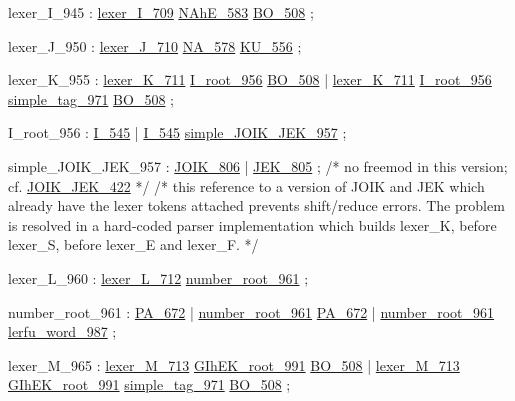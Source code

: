 \label{html:y945}
lexer_I_945             :  \hyperref[html:y709]{lexer_I_709}  \hyperref[html:y583]{NAhE_583}  \hyperref[html:y508]{BO_508}
                        ;

\label{html:y950}
lexer_J_950             :  \hyperref[html:y710]{lexer_J_710}  \hyperref[html:y578]{NA_578}  \hyperref[html:y556]{KU_556}
                        ;

\label{html:y955}
lexer_K_955             :  \hyperref[html:y711]{lexer_K_711}  \hyperref[html:y956]{I_root_956}  \hyperref[html:y508]{BO_508}
                        |  \hyperref[html:y711]{lexer_K_711}  \hyperref[html:y956]{I_root_956}  \hyperref[html:y971]{simple_tag_971}  \hyperref[html:y508]{BO_508}
                        ;

\label{html:y956}
I_root_956              :  \hyperref[html:y545]{I_545}
                        |  \hyperref[html:y545]{I_545}  \hyperref[html:y957]{simple_JOIK_JEK_957}
                        ;

\label{html:y957}
simple_JOIK_JEK_957     :  \hyperref[html:y806]{JOIK_806}
                        |  \hyperref[html:y805]{JEK_805}
                        ;
                        /* no freemod in this version; cf. \hyperref[html:y422]{JOIK_JEK_422} */
                        /* this reference to a version of JOIK and JEK
                           which already have the lexer tokens attached
                           prevents shift/reduce errors.  The problem is
                           resolved in a hard-coded parser implementation
                           which builds lexer_K, before lexer_S, before
                           lexer_E and lexer_F. */

\label{html:y960}
lexer_L_960             :  \hyperref[html:y712]{lexer_L_712}  \hyperref[html:y961]{number_root_961}
                        ;

\label{html:y961}
number_root_961         :  \hyperref[html:y672]{PA_672}
                        |  \hyperref[html:y961]{number_root_961}  \hyperref[html:y672]{PA_672}
                        |  \hyperref[html:y961]{number_root_961}  \hyperref[html:y987]{lerfu_word_987}
                        ;

\label{html:y965}
lexer_M_965             :  \hyperref[html:y713]{lexer_M_713}  \hyperref[html:y991]{GIhEK_root_991}  \hyperref[html:y508]{BO_508}
                        |  \hyperref[html:y713]{lexer_M_713}  \hyperref[html:y991]{GIhEK_root_991}  \hyperref[html:y971]{simple_tag_971}  \hyperref[html:y508]{BO_508}
                        ;

